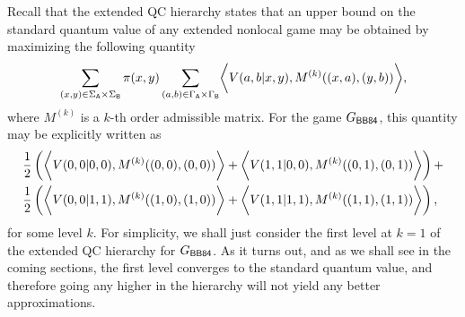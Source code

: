 Recall that the extended QC hierarchy states that an upper bound on the standard quantum value of any extended nonlocal game may be obtained by maximizing the following quantity 
\begin{align} \label{eq:npa-sdp-max}
	\sum_{(x,y) \in \Sigma_{\mathsf{A}} \times \Sigma_{\mathsf{B}}} \pi(x,y) \sum_{(a,b) \in \Gamma_{\mathsf{A}} \times \Gamma_{\mathsf{B}}} \biggl\langle V(a,b|x,y), M^{(k)}((x,a),(y,b)) \biggr\rangle,
\end{align}
where $M^{(k)}$ is a $k$-th order admissible matrix. For the game $G_{\BB84}$, this quantity may be explicitly written as 
\begin{equation} \label{eq:bb84-kth-order-admissible-matrix}
	\begin{aligned}
		&\frac{1}{2} \left( \biggl\langle  V(0,0|0,0) ,  M^{(k)}((0,0),(0,0)) \biggr\rangle + \biggl\langle  V(1,1|0,0) ,  M^{(k)}((0,1),(0,1)) \biggr\rangle \right) + \\
		&\frac{1}{2} \left( \biggl\langle  V(0,0|1,1) ,  M^{(k)}((1,0),(1,0)) \biggr\rangle + \biggl\langle  V(1,1|1,1) ,  M^{(k)}((1,1),(1,1)) \biggr\rangle \right),
	\end{aligned}
\end{equation}
for some level $k$. For simplicity, we shall just consider the first level at $k = 1$ of the extended QC hierarchy for $G_{\BB84}$. As it turns out, and as we shall see in the coming sections, the first level converges to the standard quantum value, and therefore going any higher in the hierarchy will not yield any better approximations. 

